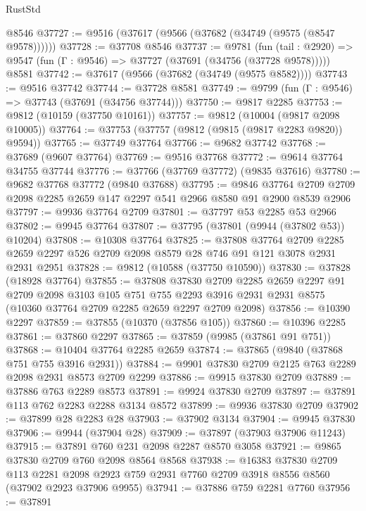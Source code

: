 \begin{lexlean}{RustStd}
\begin{coremodule}
    @8546
@37727 := @9516 (@37617 (@9566 (@37682 (@34749 (@9575 (@8547 @9578))))))
@37728 := @37708 @8546
@37737 := @9781
    (fun (tail : @2920) => @9547 (fun (Γ : @9546) => @37727 (@37691 (@34756 (@37728 @9578)))))
    @8581
@37742 := @37617 (@9566 (@37682 (@34749 (@9575 @8582))))
@37743 := @9516 @37742
@37744 := @37728 @8581
@37749 := @9799 (fun (Γ : @9546) => @37743 (@37691 (@34756 @37744)))
@37750 := @9817 @2285
@37753 := @9812 (@10159 (@37750 @10161))
@37757 := @9812 (@10004 (@9817 @2098 @10005))
@37764 := @37753 (@37757 (@9812 (@9815 (@9817 @2283 @9820)) @9594))
@37765 := @37749 @37764
@37766 := @9682 @37742
@37768 := @37689 (@9607 @37764)
@37769 := @9516 @37768
@37772 := @9614 @37764 @34755 @37744
@37776 := @37766 (@37769 @37772) (@9835 @37616)
@37780 := @9682 @37768 @37772 (@9840 @37688)
@37795 := @9846
    @37764
    @2709
    @2709
    @2098
    @2285
    @2659
    @147
    @2297
    @541
    @2966
    @8580
    @91
    @2900
    @8539
    @2906
@37797 := @9936 @37764 @2709
@37801 := @37797 @53 @2285 @53 @2966
@37802 := @9945 @37764
@37807 := @37795 (@37801 (@9944 (@37802 @53)) @10204)
@37808 := @10308 @37764
@37825 := @37808
    @37764
    @2709
    @2285
    @2659
    @2297
    @526
    @2709
    @2098
    @8579
    @28
    @746
    @91
    @121
    @3078
    @2931
    @2931
    @2951
@37828 := @9812 (@10588 (@37750 @10590))
@37830 := @37828 (@18928 @37764)
@37855 := @37808
    @37830
    @2709
    @2285
    @2659
    @2297
    @91
    @2709
    @2098
    @3103
    @105
    @751
    @755
    @2293
    @3916
    @2931
    @2931
    @8575
    (@10360 @37764 @2709 @2285 @2659 @2297 @2709 @2098)
@37856 := @10390 @2297
@37859 := @37855 (@10370 (@37856 @105))
@37860 := @10396 @2285
@37861 := @37860 @2297
@37865 := @37859 (@9985 (@37861 @91 @751))
@37868 := @10404 @37764 @2285 @2659
@37874 := @37865 (@9840 (@37868 @751 @755 @3916 @2931))
@37884 := @9901 @37830 @2709 @2125 @763 @2289 @2098 @2931 @8573 @2709 @2299
@37886 := @9915 @37830 @2709
@37889 := @37886 @763 @2289 @8573
@37891 := @9924 @37830 @2709
@37897 := @37891 @113 @762 @2283 @2288 @3134 @8572
@37899 := @9936 @37830 @2709
@37902 := @37899 @28 @2283 @28
@37903 := @37902 @3134
@37904 := @9945 @37830
@37906 := @9944 (@37904 @28)
@37909 := @37897 (@37903 @37906 @11243)
@37915 := @37891 @760 @231 @2098 @2287 @8570 @3058
@37921 := @9865 @37830 @2709 @760 @2098 @8564 @8568
@37938 := @16383
    @37830
    @2709
    @113
    @2281
    @2098
    @2923
    @759
    @2931
    @7760
    @2709
    @3918
    @8556
    @8560
    (@37902 @2923 @37906 @9955)
@37941 := @37886 @759 @2281 @7760
@37956 := @37891

\end{coremodule}
\end{lexlean}
